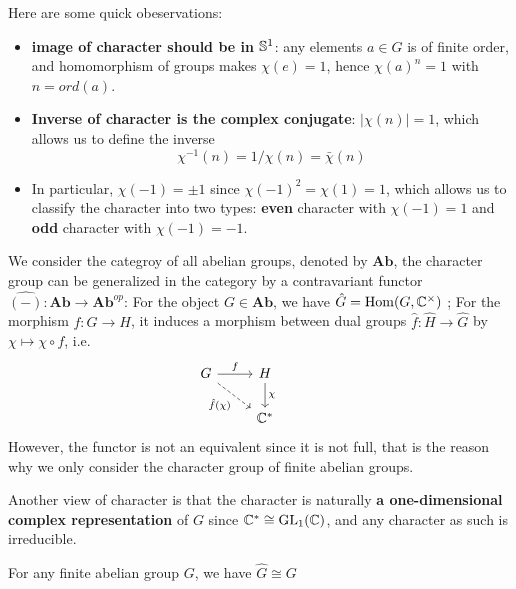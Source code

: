 Here are some quick obeservations:
\begin{itemize}
        \item \textbf{image of character should be in \(\mathbb{S}^1\)}: any elements \(a \in G\) is of finite order, and homomorphism of groups makes \(\chi(e) = 1\), hence \(\chi(a)^n = 1\) with \(n = ord(a)\).
    \item \textbf{Inverse of character is the complex conjugate}: \(|\chi(n)| = 1\), which allows us to define the inverse
    \[\chi^{-1}(n) = 1/\chi(n) = \bar{\chi}(n)\]
    \item In particular, \(\chi(-1) = \pm 1\) since \(\chi(-1)^2 = \chi(1) = 1\), which allows us to classify the character into two types: \textbf{even} character with \(\chi(-1) = 1\) and \textbf{odd} character with \(\chi(-1) = -1\).
\end{itemize}
\begin{remark}
    We consider the categroy of all abelian groups, denoted by \(\mathbf{Ab}\), the character group can be generalized in the category by a contravariant functor \(\hat{(-)}: \mathbf{Ab} \to \mathbf{Ab}^{op}\): For the object \(G \in \mathbf{Ab}\), we have \(\hat{G} = \operatorname{Hom}(G, \mathbb{C}^\times)\) ; For the morphism \(f:G \to H\), it induces a morphism between dual groups \(\hat{f}: \hat{H} \to \hat{G}\) by \(\chi \mapsto \chi \circ f\), i.e.
\[\begin{tikzcd}
	G & H & {} \\
	& {\mathbb{C}^*}
	\arrow["f", from=1-1, to=1-2]
	\arrow["{\hat{f}(\chi)}"', dashed, from=1-1, to=2-2]
	\arrow["\chi", from=1-2, to=2-2]
\end{tikzcd}\]
    However, the functor is not an equivalent since it is not full, that is the reason why we only consider the character group of finite abelian groups.
\end{remark}

\begin{remark}
    Another view of character is that the character is naturally \textbf{a one-dimensional complex representation} of \(G\) since \(\mathbb{C}^* \cong \operatorname{GL}_1(\mathbb{C})\), and any character as such is irreducible.
\end{remark}


\begin{proposition}
    For any finite abelian group \(G\), we have \(\hat{G} \cong G\)
\end{proposition}

